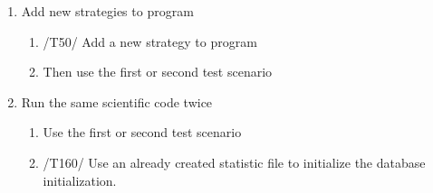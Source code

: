 {\begin{enumerate}
			
			
			\item Add new strategies to program
			
			\begin{enumerate}
				\item /T50/ Add a new strategy to program
				\item Then use the first or second test scenario
			\end{enumerate}
			
			
			\item Run the same scientific code twice
				\begin{enumerate}
					\item Use the first or second test scenario
					\item /T160/ Use an already created statistic file to initialize the database initialization.
				\end{enumerate}
		\end{enumerate}
		
}
